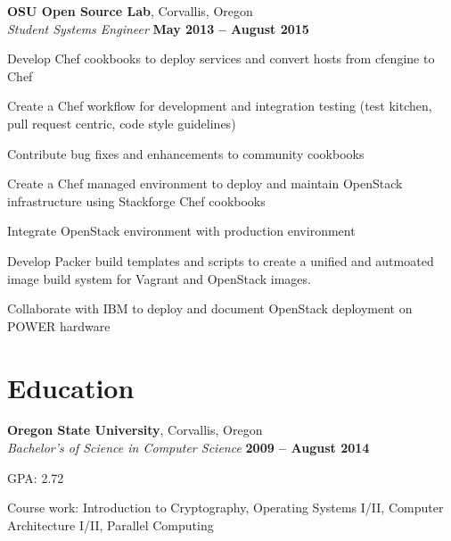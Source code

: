 \documentclass[margin,line]{resume}
\begin{document}
\begin{resume}
    \textbf{OSU Open Source Lab}, Corvallis, Oregon \vspace{2mm}\\\vspace{1mm}%
    \textsl{Student Systems Engineer} \hfill \textbf{May 2013 -- August 2015}\\
    \begin{list2}
        \item Develop Chef cookbooks to deploy services and convert hosts from cfengine to Chef
        \item Create a Chef workflow for development and integration testing (test kitchen, pull request centric, code style guidelines)
        \item Contribute bug fixes and enhancements to community cookbooks
        \item Create a Chef managed environment to deploy and maintain OpenStack infrastructure using Stackforge Chef cookbooks
        \item Integrate OpenStack environment with production environment
        \item Develop Packer build templates and scripts to create a unified and autmoated image build system for Vagrant and OpenStack images.
        \item Collaborate with IBM to deploy and document OpenStack deployment on POWER hardware\\
    \end{list2}\vspace{-1.5mm}


    \section{\mysidestyle Education}

    \textbf{Oregon State University}, Corvallis, Oregon \vspace{2mm}\\\vspace{1mm}%
    \textsl{Bachelor's of Science in Computer Science} \hfill \textbf{ 2009 -- August 2014}\vspace{-3mm}\\\vspace{-1mm}%
    \begin{list2}
        \item GPA:  2.72
        \item Course work: Introduction to Cryptography, Operating Systems I/II,
              Computer Architecture I/II, Parallel Computing\\
    \end{list2}\vspace{-1.5mm}



\end{resume}
\end{document}

